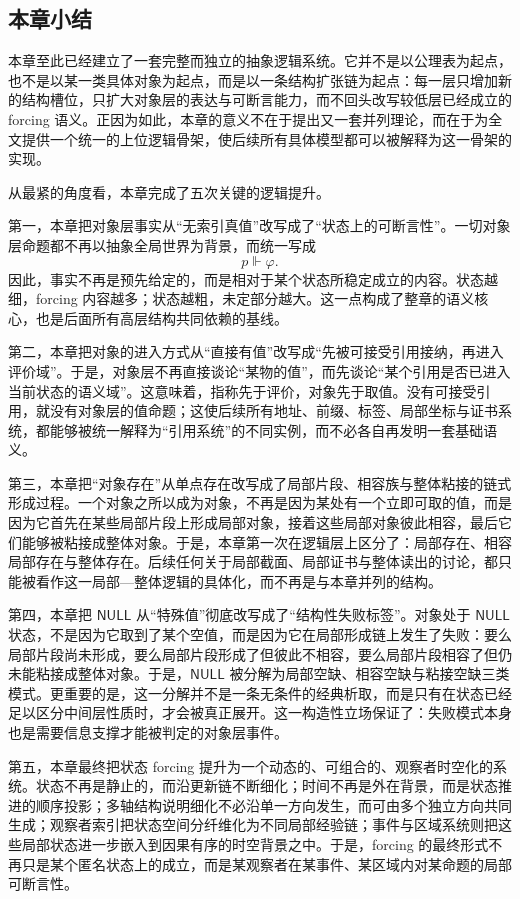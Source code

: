 \subsection{本章小结}\label{subsec:logic-expansion-chain-summary}

本章至此已经建立了一套完整而独立的抽象逻辑系统。它并不是以公理表为起点，也不是以某一类具体对象为起点，而是以一条结构扩张链为起点：每一层只增加新的结构槽位，只扩大对象层的表达与可断言能力，而不回头改写较低层已经成立的 forcing 语义。正因为如此，本章的意义不在于提出又一套并列理论，而在于为全文提供一个统一的上位逻辑骨架，使后续所有具体模型都可以被解释为这一骨架的实现。

从最紧的角度看，本章完成了五次关键的逻辑提升。

第一，本章把对象层事实从“无索引真值”改写成了“状态上的可断言性”。一切对象层命题都不再以抽象全局世界为背景，而统一写成
\[
p\Vdash \varphi.
\]
因此，事实不再是预先给定的，而是相对于某个状态所稳定成立的内容。状态越细，forcing 内容越多；状态越粗，未定部分越大。这一点构成了整章的语义核心，也是后面所有高层结构共同依赖的基线。

第二，本章把对象的进入方式从“直接有值”改写成“先被可接受引用接纳，再进入评价域”。于是，对象层不再直接谈论“某物的值”，而先谈论“某个引用是否已进入当前状态的语义域”。这意味着，指称先于评价，对象先于取值。没有可接受引用，就没有对象层的值命题；这使后续所有地址、前缀、标签、局部坐标与证书系统，都能够被统一解释为“引用系统”的不同实例，而不必各自再发明一套基础语义。

第三，本章把“对象存在”从单点存在改写成了局部片段、相容族与整体粘接的链式形成过程。一个对象之所以成为对象，不再是因为某处有一个立即可取的值，而是因为它首先在某些局部片段上形成局部对象，接着这些局部对象彼此相容，最后它们能够被粘接成整体对象。于是，本章第一次在逻辑层上区分了：局部存在、相容局部存在与整体存在。后续任何关于局部截面、局部证书与整体读出的讨论，都只能被看作这一局部—整体逻辑的具体化，而不再是与本章并列的结构。

第四，本章把 \(\mathsf{NULL}\) 从“特殊值”彻底改写成了“结构性失败标签”。对象处于 \(\mathsf{NULL}\) 状态，不是因为它取到了某个空值，而是因为它在局部形成链上发生了失败：要么局部片段尚未形成，要么局部片段形成了但彼此不相容，要么局部片段相容了但仍未能粘接成整体对象。于是，\(\mathsf{NULL}\) 被分解为局部空缺、相容空缺与粘接空缺三类模式。更重要的是，这一分解并不是一条无条件的经典析取，而是只有在状态已经足以区分中间层性质时，才会被真正展开。这一构造性立场保证了：失败模式本身也是需要信息支撑才能被判定的对象层事件。

第五，本章最终把状态 forcing 提升为一个动态的、可组合的、观察者时空化的系统。状态不再是静止的，而沿更新链不断细化；时间不再是外在背景，而是状态推进的顺序投影；多轴结构说明细化不必沿单一方向发生，而可由多个独立方向共同生成；观察者索引把状态空间分纤维化为不同局部经验链；事件与区域系统则把这些局部状态进一步嵌入到因果有序的时空背景之中。于是，forcing 的最终形式不再只是某个匿名状态上的成立，而是某观察者在某事件、某区域内对某命题的局部可断言性。

